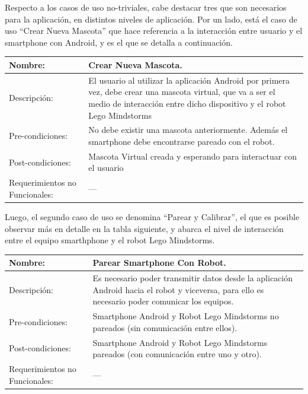 \documentclass[letterpaper,12pt]{article} %
\numberwithin{equation}{section} %
\numberwithin{figure}{section} %
\numberwithin{table}{section} %
\begin{document}
Respecto a los casos de uso no-triviales, cabe destacar tres que son necesarios para la aplicaci\'on, en distintos niveles de aplicaci\'on. Por un lado, est\'a el caso de uso ``Crear Nueva Mascota'' que hace referencia a la interacci\'on entre usuario y el smartphone con Android, y es el que se detalla a continuaci\'on.\\

\begin{table}[H]
  \centering
  \begin{tabular}{p{5cm}p{9cm}}\hline\hline
    Nombre: & Crear Nueva Mascota. \\ \hline
    Descripci\'on: & El usuario al utilizar la aplicaci\'on Android por primera vez, debe crear una mascota virtual, que va a ser el medio de interacci\'on entre dicho dispositivo y el robot Lego Mindstorms\\ \hline %
    Pre-condiciones: & No debe existir una mascota anteriormente. Adem\'as el smartphone debe encontrarse pareado con el robot.\\ \hline
    Post-condiciones: & Mascota Virtual creada y esperando para interactuar con el usuario\\ \hline
    Requerimientos no Funcionales: & ---\\ \hline\hline %
  \end{tabular}
  \label{tab:Crear}
\end{table}

Luego, el segundo caso de uso se denomina ``Parear y Calibrar'', el que es posible observar m\'as en detalle en la tabla siguiente, y abarca el nivel de interacci\'on entre el equipo smarthphone y el robot Lego Mindstorms.\\

\begin{table}[H]
  \centering
  \begin{tabular}{p{5cm}p{9cm}}\hline\hline
    Nombre: & Parear Smartphone Con Robot. \\ \hline
    Descripci\'on: & Es necesario poder transmitir datos desde la aplicaci\'on Android hacia el robot y viceversa, para ello es necesario poder comunicar los equipos.\\ \hline %
    Pre-condiciones: & Smartphone Android y Robot Lego Mindstorms no pareados (sin comunicaci\'on entre ellos).\\ \hline
    Post-condiciones: & Smartphone Android y Robot Lego Mindstorms pareados (con comunicaci\'on entre uno y otro).\\ \hline
    Requerimientos no Funcionales: & ---\\ \hline\hline %
  \end{tabular}
  \label{tab:Parear}
\end{table}
\end{document}
